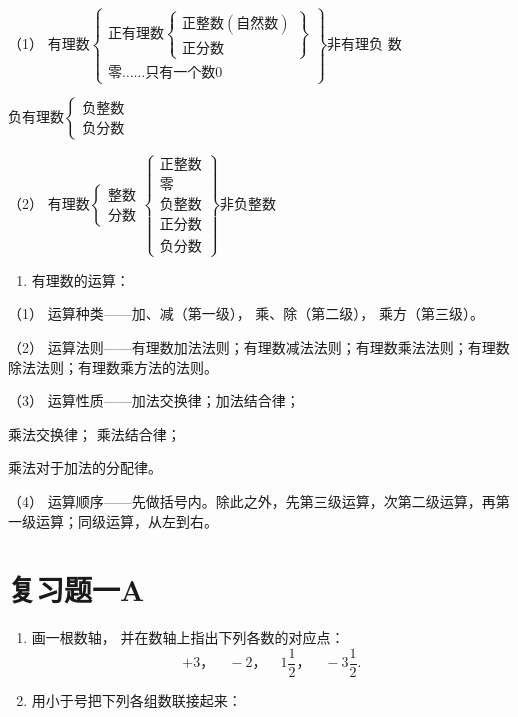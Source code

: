 （1）
有理数\(\left\{\begin{array}{l} \text{正有理数} \left\{\begin{array}{l} \text{正整数}(\text{自然数}) \\ \text{正分数} \end{array}\right\} \\ \text{零}……\text{只有一个数} 0 \end{array}\right\}\)非有理负
数

负有理数\(\left\{\begin{array}{l} \text{负整数} \\ \text{负分数} \end{array}\right.\)

（2）
有理数\(\left\{\begin{array}{l} \text{整} \text{数} \\ \text{分} \text{数} \end{array}\right.\)\(\left\{\begin{array}{l} \text{正整数} \\ \text{零} \\ \text{负整数} \\ \text{正分数} \\ \text{负分数} \end{array}\right\}\)非负整数

\begin{enumerate}[start=3]
\item
  有理数的运算：
\end{enumerate}

（1） 运算种类------加、减（第一级）， 乘、除（第二级），
乘方（第三级）。

（2）
运算法则------有理数加法法则；有理数减法法则；有理数乘法法则；有理数除法法则；有理数乘方法的法则。

（3） 运算性质------加法交换律；加法结合律；

乘法交换律； 乘法结合律；

乘法对于加法的分配律。

（4）
运算顺序------先做括号内。除此之外，先第三级运算，次第二级运算，再第一级运算；同级运算，从左到右。

\section{复习题一A}

\begin{enumerate}
\item
  画一根数轴， 并在数轴上指出下列各数的对应点：
\[
+ 3\text{，} \quad - 2\text{，} \quad 1 \frac{1}{2}\text{，} \quad - 3 \frac{1}{2}.
\]
\item
  用小于号把下列各组数联接起来：
\end{enumerate}


